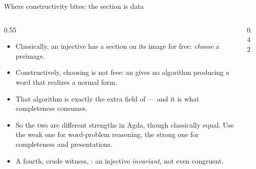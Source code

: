 \begin{frame}{Where constructivity bites: the section is data \InPaper}
\begin{columns}[c]
\begin{column}{0.55\textwidth}
\begin{itemize}
  \setlength{\itemsep}{5pt}
  \item Classically, an injective  has a section on its image for
        free: \emph{choose} a preimage.
  \item Constructively, choosing is not free: an  gives
        \alert{no algorithm} producing a word that realizes a normal form.
  \item That algorithm is exactly the extra field of  ---
        and it is what completeness consumes.
  \item So the two are \alert{different strengths} in Agda, though
        classically equal. Use the weak one for word-problem reasoning, the
        strong one for completeness and presentations.
  \item A fourth, crude witness, : an injective
        \emph{invariant}, not even congruent.
\end{itemize}
\end{column}
\begin{column}{0.42\textwidth}
\centering
{}
\end{column}
\end{columns}
\end{frame}

